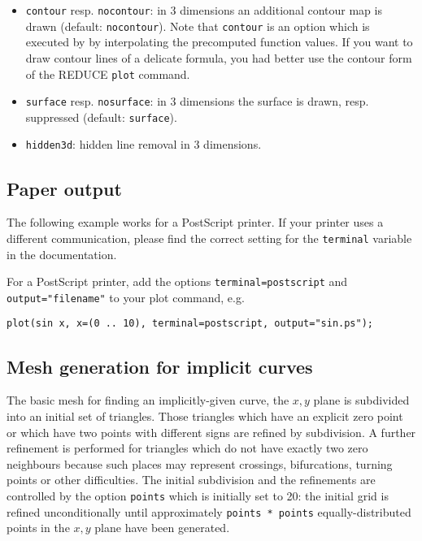 \begin{itemize}
  \item \texttt{contour} resp. \texttt{nocontour}: in 3 dimensions an additional
    contour map is drawn (default: \texttt{nocontour}).  Note that
    \texttt{contour} is an option which is executed by {\Gnuplot} by
    interpolating the precomputed function values. If you want to draw contour
    lines of a delicate formula, you had better use the contour form of the
    REDUCE \texttt{plot} command.
  \item \texttt{surface} resp. \texttt{nosurface}: in 3 dimensions the surface
    is drawn, resp.  suppressed (default: \texttt{surface}).
  \item \texttt{hidden3d}: hidden line removal in 3 dimensions.
\end{itemize}


\subsection{Paper output}

The following example works for a PostScript printer.  If your printer uses a
different communication, please find the correct setting for the \texttt{terminal}
variable in the {\Gnuplot} documentation.

For a PostScript printer, add the options \texttt{terminal=postscript} and \allowbreak
\texttt{output="filename"} to your plot command, e.g.
\begin{verbatim}
plot(sin x, x=(0 .. 10), terminal=postscript, output="sin.ps");
\end{verbatim}


\subsection{Mesh generation for implicit curves}

The basic mesh for finding an implicitly-given curve, the $x,y$ plane is
subdivided into an initial set of triangles.  Those triangles which have an
explicit zero point or which have two points with different signs are refined by
subdivision.  A further refinement is performed for triangles which do not have
exactly two zero neighbours because such places may represent crossings,
bifurcations, turning points or other difficulties.  The initial subdivision and
the refinements are controlled by the option \texttt{points} which is initially
set to 20: the initial grid is refined unconditionally until
approximately \texttt{points * points} equally-distributed points in the $x,y$
plane have been generated.

